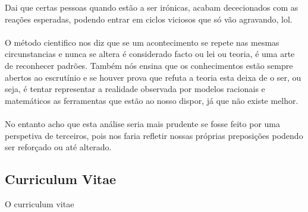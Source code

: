 Dai que certas pessoas quando estão a ser irónicas, acabam dececionados com as reações esperadas, podendo entrar em ciclos viciosos que só vão agravando, lol.\\
\\
O método cientifico nos diz que se um acontecimento se repete nas mesmas circunstancias e nunca se altera é considerado facto ou lei ou teoria, é uma arte de reconhecer padrões. Também nós ensina que os conhecimentos estão sempre abertos ao escrutínio e se houver prova que refuta a teoria esta deixa de o ser, ou seja, é tentar representar a realidade observada por modelos racionais e matemáticos as ferramentas que estão ao nosso dispor, já que não existe melhor. \\
\\
No entanto acho que esta análise seria mais prudente se fosse feito por uma perspetiva de terceiros, pois nos faria refletir nossas próprias preposições podendo ser reforçado ou até alterado.
\subsection{Curriculum Vitae}
\qquad O curriculum vitae

